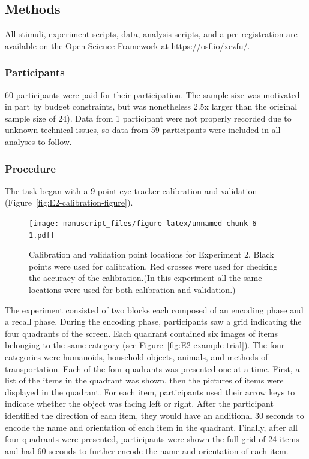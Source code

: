 \documentclass[
  man,floatsintext]{apa6}
\begin{document}
\hypertarget{methods-1}{%
\subsection{Methods}\label{methods-1}}

All stimuli, experiment scripts, data, analysis scripts, and a
pre-registration are available on the Open Science Framework at
\url{https://osf.io/xezfu/}.

\hypertarget{participants-2}{%
\subsubsection{Participants}\label{participants-2}}

60 participants were paid for their participation.
The sample size was motivated in part by budget constraints, but was
nonetheless 2.5x larger than the original sample size of 24).
Data from 1 participant were not properly
recorded due to unknown technical issues, so data from 59 participants
were included in all analyses to follow.

\hypertarget{procedure-1}{%
\subsubsection{Procedure}\label{procedure-1}}

The task began with a 9-point eye-tracker calibration
and validation (Figure~\ref{fig:E2-calibration-figure}).

\begin{figure}
\centering
\texttt{[image: manuscript\_files/figure-latex/unnamed-chunk-6-1.pdf]}
\caption{\label{fig:unnamed-chunk-6}Calibration and validation point locations for Experiment 2. Black points were used for calibration. Red crosses were used for checking the accuracy of the calibration.(In this experiment all the same locations were used for both calibration and validation.)}
\end{figure}

The experiment consisted of two blocks each composed of an encoding
phase and a recall phase. During the encoding phase, participants saw a
grid indicating the four quadrants of the screen. Each quadrant
contained six images of items belonging to the same category (see Figure~\ref{fig:E2-example-trial}).
The four categories were humanoids, household objects, animals, and
methods of transportation.
Each of the four quadrants was presented one at a time. First, a list of
the items in the quadrant was shown, then the pictures of items were displayed in the quadrant.
For each item, participants used their arrow keys to indicate whether the object was facing left or right. After the participant identified the direction of each
item, they would have an additional 30 seconds to encode the name and
orientation of each item in the quadrant. Finally, after all four quadrants
were presented, participants were shown the full grid of
24 items and had 60 seconds to further encode the name and orientation
of each item.
\end{document}
